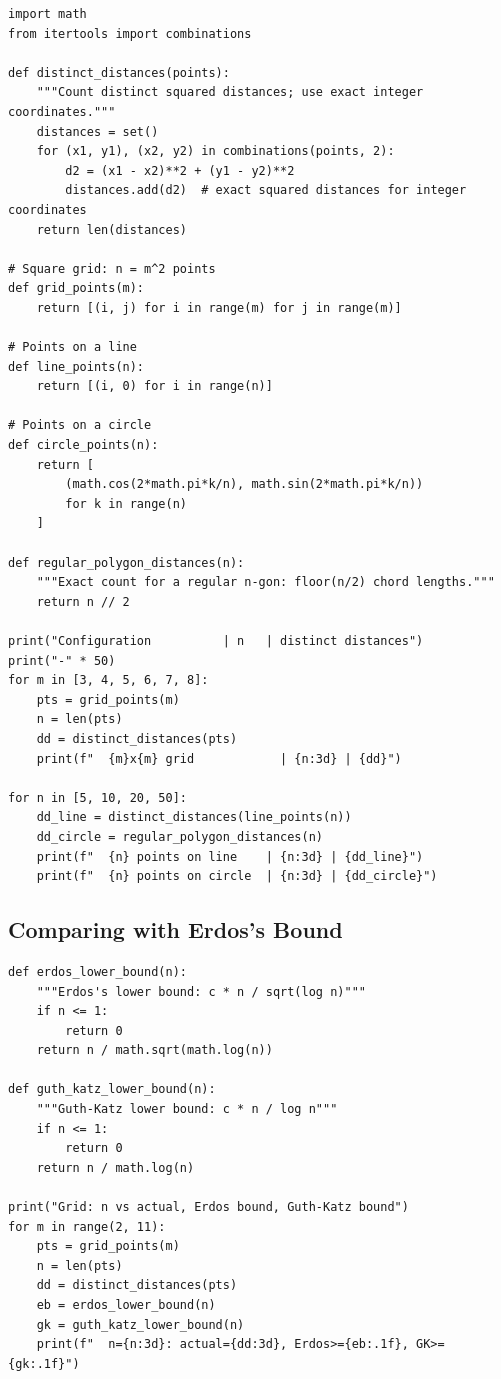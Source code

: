 \begin{verbatim}
import math
from itertools import combinations

def distinct_distances(points):
    """Count distinct squared distances; use exact integer coordinates."""
    distances = set()
    for (x1, y1), (x2, y2) in combinations(points, 2):
        d2 = (x1 - x2)**2 + (y1 - y2)**2
        distances.add(d2)  # exact squared distances for integer coordinates
    return len(distances)

# Square grid: n = m^2 points
def grid_points(m):
    return [(i, j) for i in range(m) for j in range(m)]

# Points on a line
def line_points(n):
    return [(i, 0) for i in range(n)]

# Points on a circle
def circle_points(n):
    return [
        (math.cos(2*math.pi*k/n), math.sin(2*math.pi*k/n))
        for k in range(n)
    ]

def regular_polygon_distances(n):
    """Exact count for a regular n-gon: floor(n/2) chord lengths."""
    return n // 2

print("Configuration          | n   | distinct distances")
print("-" * 50)
for m in [3, 4, 5, 6, 7, 8]:
    pts = grid_points(m)
    n = len(pts)
    dd = distinct_distances(pts)
    print(f"  {m}x{m} grid            | {n:3d} | {dd}")

for n in [5, 10, 20, 50]:
    dd_line = distinct_distances(line_points(n))
    dd_circle = regular_polygon_distances(n)
    print(f"  {n} points on line    | {n:3d} | {dd_line}")
    print(f"  {n} points on circle  | {n:3d} | {dd_circle}")
\end{verbatim}

\subsection{Comparing with Erdos's Bound}

\begin{verbatim}
def erdos_lower_bound(n):
    """Erdos's lower bound: c * n / sqrt(log n)"""
    if n <= 1:
        return 0
    return n / math.sqrt(math.log(n))

def guth_katz_lower_bound(n):
    """Guth-Katz lower bound: c * n / log n"""
    if n <= 1:
        return 0
    return n / math.log(n)

print("Grid: n vs actual, Erdos bound, Guth-Katz bound")
for m in range(2, 11):
    pts = grid_points(m)
    n = len(pts)
    dd = distinct_distances(pts)
    eb = erdos_lower_bound(n)
    gk = guth_katz_lower_bound(n)
    print(f"  n={n:3d}: actual={dd:3d}, Erdos>={eb:.1f}, GK>={gk:.1f}")
\end{verbatim}

